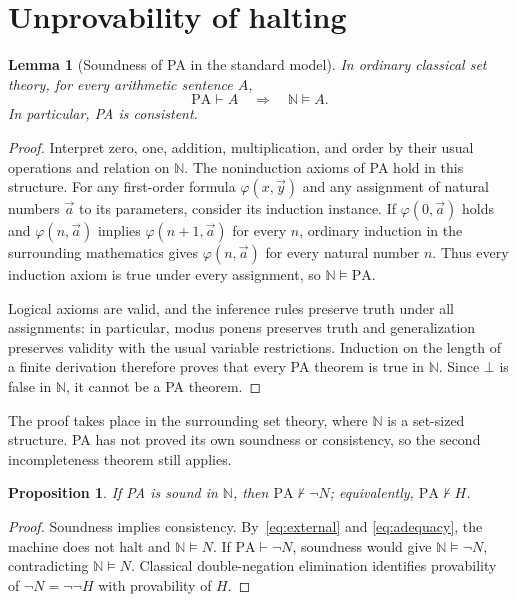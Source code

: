 \documentclass[11pt,letterpaper]{article}
\newtheorem{lemma}[theorem]{Lemma}
\newtheorem{proposition}[theorem]{Proposition}
\newcommand{\PA}{\mathrm{PA}}
\newcommand{\NN}{\mathbb{N}}
\begin{document}
\section{Unprovability of halting}\label{sec:two-sided}

\begin{lemma}[Soundness of PA in the standard model]\label{lem:sound}
In ordinary classical set theory, for every arithmetic sentence $A$,
\[
\PA\vdash A\quad\Longrightarrow\quad\NN\models A.
\]
In particular, PA is consistent.
\end{lemma}
\begin{proof}
Interpret zero, one, addition, multiplication, and order by their usual
operations and relation on $\NN$. The noninduction axioms of PA hold in
this structure. For any first-order formula $\varphi(x,\vec y)$ and any
assignment of natural numbers $\vec a$ to its parameters, consider its
induction instance. If $\varphi(0,\vec a)$ holds and
$\varphi(n,\vec a)$ implies $\varphi(n+1,\vec a)$ for every $n$, ordinary
induction in the surrounding mathematics gives $\varphi(n,\vec a)$ for
every natural number $n$. Thus every induction axiom is true under every
assignment, so $\NN\models\PA$.

Logical axioms are valid, and the inference rules preserve truth under
all assignments: in particular, modus ponens preserves truth and
generalization preserves validity with the usual variable restrictions.
Induction on the length of a finite derivation therefore proves that
every PA theorem is true in $\NN$. Since $\bot$ is false in $\NN$, it
cannot be a PA theorem.
\end{proof}

The proof takes place in the surrounding set theory, where $\NN$ is a
set-sized structure. PA has not proved its own soundness or consistency,
so the second incompleteness theorem still applies.

\begin{proposition}\label{prop:second}
If PA is sound in $\NN$, then $\PA\nvdash\neg N$; equivalently,
$\PA\nvdash H$.
\end{proposition}
\begin{proof}
Soundness implies consistency. By~\eqref{eq:external} and
\eqref{eq:adequacy}, the machine does not halt and $\NN\models N$.
If $\PA\vdash\neg N$, soundness would give $\NN\models\neg N$,
contradicting $\NN\models N$. Classical double-negation elimination
identifies provability of $\neg N=\neg\neg H$ with provability of $H$.
\end{proof}
\end{document}
